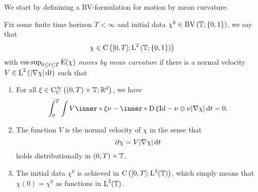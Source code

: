 We start by definining a BV-formulation for motion by mean curvature.

\begin{definition}
	\label{motion_by_mcv}
	Fix some finite time horizon $ T < \infty $ and initial data $ \chi^{ 0 }\in \operatorname{BV} \left( \operatorname{\mathbb{T}} ; \{ 0 , 1 \} \right) $, we say that 
	\begin{equation*}
		\chi \in 
		\operatorname{C} \left(
			[ 0 , T ] ; \operatorname{L}^{ 2 } \left( \operatorname{\mathbb{T}} ; \{ 0 , 1 \}  \right)
		\right)
	\end{equation*}
	with $ \operatorname*{ess\,sup}_{ 0 \leq t \leq T } \operatorname{E} ( \chi ) $ \emph{moves by mean curvature} if there is a normal velocity
	$ V \in \operatorname{L}^{ 2 } \left( \abs{ \nabla \chi } \dd{ t } \right) $ such that 
	\begin{enumerate}
		\item 
		For all 
		$ \xi \in \operatorname{C}_{ \mathrm{ C } }^{ \infty } \left( ( 0 , T ) \times \operatorname{\mathbb{T}} ; \mathbb{ R }^{ d } \right) $,
		we have
		\begin{equation}
			\label{integral_formulation_of_mcf}
			\int_{ 0 }^{ T }
				\int
					V \inner*{ \xi }{ \nu }
					- 
					\inner*{ \diff \xi }{ \mathrm{ Id } - \nu \otimes \nu }
				\abs{ \nabla \chi }
			\dd{ t }
			=
			0.
		\end{equation}
	\item 
	The function $ V $ is the normal velocity of $ \chi $ in the sense that 
	\begin{equation*}
		\partial \chi
		=
		V
		\abs{ \nabla \chi }
		\dd{ t }
	\end{equation*}
	holds distributionally in $ ( 0 , T ) \times \operatorname{\mathbb{T}} $.
	\item 
	The initial data $ \chi^{ 0 } $ is achieved in $ \operatorname{C} \left( [ 0 , T ] ; \operatorname{L}^{  2 } ( \operatorname{\mathbb{T}} ) \right) $, which simply means that $ \chi ( 0 ) = \chi^{ 0 } $ as functions in $ \operatorname{L}^{ 2 } ( \operatorname{\mathbb{T}} ) $.
	\end{enumerate}
\end{definition}

